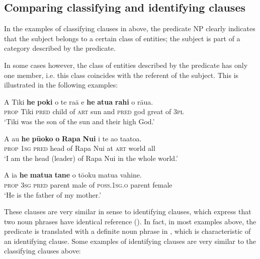 \subsection{Comparing classifying and identifying clauses}\label{sec:9.2.3}

In the examples of classifying clauses in  above, the predicate NP clearly indicates that the subject belongs to a certain class of entities; the subject is part of a category described by the predicate. 

In some cases however, the class of entities described by the predicate has only one member, i.e. this class coincides with the referent of the subject. This is illustrated in the following examples:

\ea\label{ex:9.20}
\gll A Tiki \textbf{he} \textbf{poki} o te ra{\ꞌ}ā {\ꞌ}e \textbf{he} \textbf{{\ꞌ}atua} \textbf{rahi} o rāua. \\
\textsc{prop} Tiki \textsc{pred} child of \textsc{art} sun and \textsc{pred} god great of \textsc{3pl} \\

\glt 
‘Tiki was the son of the sun and their high God.’ \textstyleExampleref{[R376.027]} 
\z

\ea\label{ex:9.21}
\gll A au \textbf{he} \textbf{pū{\ꞌ}oko} \textbf{o} \textbf{Rapa} \textbf{Nui} {\ꞌ}i te ao ta{\ꞌ}ato{\ꞌ}a. \\
\textsc{prop} \textsc{1sg} \textsc{pred} head of Rapa Nui at \textsc{art} world all \\

\glt 
‘I am the head (leader) of Rapa Nui in the whole world.’ \textstyleExampleref{[R648.290]} 
\z

\ea\label{ex:9.22}
\gll A ia \textbf{he} \textbf{matu{\ꞌ}a} \textbf{tane} o tō{\ꞌ}oku matu{\ꞌ}a vahine. \\
\textsc{prop} \textsc{3sg} \textsc{pred} parent male of \textsc{poss.1sg.o} parent female \\

\glt
‘He is the father of my mother.’ \textstyleExampleref{[R487.040]} 
\z

These clauses are very similar in sense to identifying clauses, which express that two noun phrases have identical reference (). In fact, in most examples above, the predicate is translated with a definite noun phrase in , which is characteristic of an identifying clause. Some examples of identifying clauses are very similar to the classifying clauses above:

